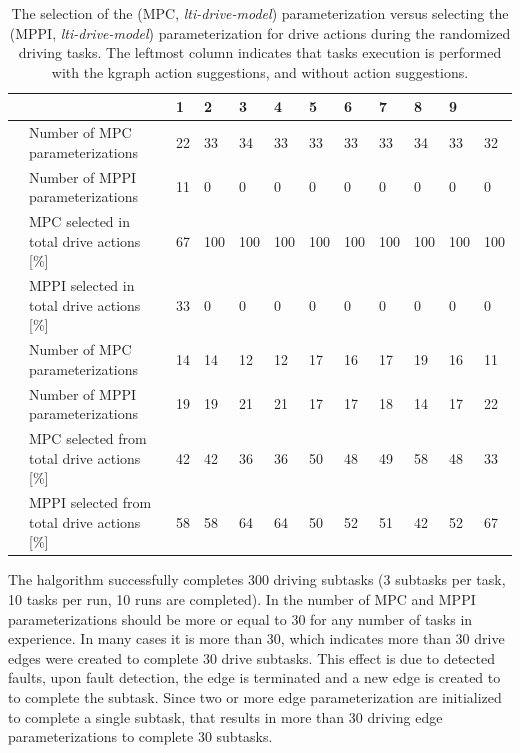 \begin{table}[H]
    \caption{The selection of the (\ac{MPC}, \textit{lti-drive-model}) parameterization versus selecting the (\ac{MPPI}, \textit{lti-drive-model}) parameterization for drive actions during the randomized driving tasks. The leftmost column indicates that tasks execution is performed with the \ac{kgraph} action suggestions, and without action suggestions.}%
    \label{table:rand_drive_mpc_vs_mppi}
    \centering
    \begin{tabular}%
      {%
        >{\raggedright\arraybackslash}p{}
        >{\raggedright\arraybackslash}p{}
      |p{0.4cm}p{0.4cm}p{0.4cm}p{0.4cm}p{0.4cm}p{0.4cm}p{0.4cm}p{0.4cm}p{0.4cm}p{0.4cm}}
      \multicolumn{2}{c|}{Number of Tasks in experience} &0&1&2&3&4&5&6&7&8&9\\\toprule
      \multirow{4}{0.1\textwidth}{With \ac{kgraph} suggestions} 
      &Number of \ac{MPC} parameterizations&22&33&34&33&33&33&33&34&33&32\\
      &Number of \ac{MPPI} parameterizations&11&0&0&0&0&0&0&0&0&0\\
      & \ac{MPC} selected in total drive actions [\%]&67&100&100&100&100&100&100&100&100&100\\
      & \ac{MPPI} selected in total drive actions [\%]&33&0&0&0&0&0&0&0&0&0\\\midrule
      \multirow{4}{0.1\textwidth}{Without \ac{kgraph} suggestions} 
      &Number of \ac{MPC} parameterizations &14&14&12&12&17&16&17&19&16&11\\
      &Number of \ac{MPPI} parameterizations &19&19&21&21&17&17&18&14&17&22\\
      & \ac{MPC} selected from total drive actions [\%] &42&42&36&36&50&48&49&58&48&33\\
      & \ac{MPPI} selected from total drive actions [\%]&58&58&64&64&50&52&51&42&52&67\\
    \end{tabular}
\end{table}

The \ac{halgorithm} successfully completes 300 driving subtasks (3 subtasks per task, 10 tasks per run, 10 runs are completed). In  the number of \ac{MPC} and \ac{MPPI} parameterizations should be more or equal to 30 for any number of tasks in experience. In many cases it is more than 30, which indicates more than 30 drive edges were created to complete 30 drive subtasks. This effect is due to detected faults, upon fault detection, the edge is terminated and a new edge is created to to complete the subtask. Since two or more edge parameterization are initialized to complete a single subtask, that results in more than 30 driving edge parameterizations to complete 30 subtasks.\bs

